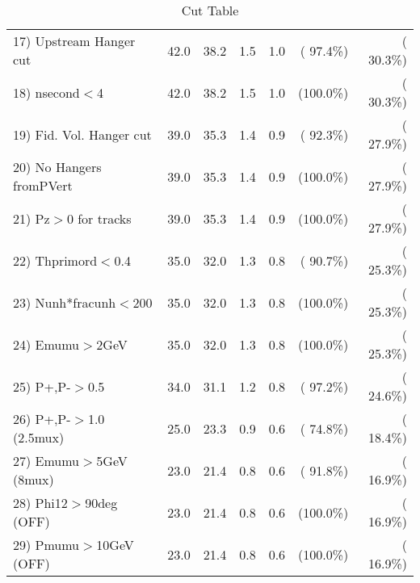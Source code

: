 \begin{table}[h!]
\begin{tabular}{||l||r|r|r|r|r|r||}
 17) Upstream Hanger cut  &         42.0 &         38.2 &          1.5 &          1.0 & ( 97.4\%) & ( 30.3\%) \\
 18) nsecond$<$4          &         42.0 &         38.2 &          1.5 &          1.0 & (100.0\%) & ( 30.3\%) \\
 19) Fid. Vol. Hanger cut &         39.0 &         35.3 &          1.4 &          0.9 & ( 92.3\%) & ( 27.9\%) \\
 20) No Hangers fromPVert &         39.0 &         35.3 &          1.4 &          0.9 & (100.0\%) & ( 27.9\%) \\
 21) Pz$>$0 for tracks    &         39.0 &         35.3 &          1.4 &          0.9 & (100.0\%) & ( 27.9\%) \\
 22) Thprimord$<$0.4      &         35.0 &         32.0 &          1.3 &          0.8 & ( 90.7\%) & ( 25.3\%) \\
 23) Nunh*fracunh$<$200   &         35.0 &         32.0 &          1.3 &          0.8 & (100.0\%) & ( 25.3\%) \\
 24) Emumu$>$2GeV         &         35.0 &         32.0 &          1.3 &          0.8 & (100.0\%) & ( 25.3\%) \\
 25) P+,P-$>$0.5          &         34.0 &         31.1 &          1.2 &          0.8 & ( 97.2\%) & ( 24.6\%) \\
 26) P+,P-$>$1.0 (2.5mux) &         25.0 &         23.3 &          0.9 &          0.6 & ( 74.8\%) & ( 18.4\%) \\
 27) Emumu$>$5GeV  (8mux) &         23.0 &         21.4 &          0.8 &          0.6 & ( 91.8\%) & ( 16.9\%) \\
 28) Phi12$>$90deg  (OFF) &         23.0 &         21.4 &          0.8 &          0.6 & (100.0\%) & ( 16.9\%) \\
 29) Pmumu$>$10GeV  (OFF) &         23.0 &         21.4 &          0.8 &          0.6 & (100.0\%) & ( 16.9\%) \\
 \hline
 \hline
 \end{tabular}
 \caption{Cut Table           }
 \label{tab-cutcohjpsi-mumu_cohrho0}
 \end{table}
